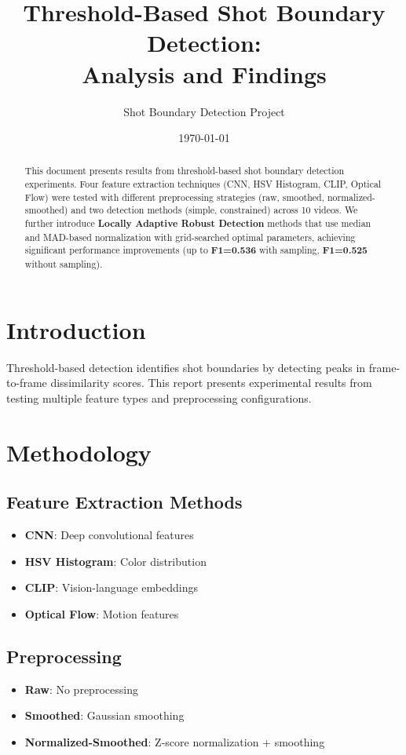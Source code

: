 \documentclass[11pt,a4paper]{article}
\title{\textbf{Threshold-Based Shot Boundary Detection:\\Analysis and Findings}}
\author{Shot Boundary Detection Project}
\date{\today}
\begin{document}
\maketitle

\begin{abstract}
This document presents results from threshold-based shot boundary detection experiments. Four feature extraction techniques (CNN, HSV Histogram, CLIP, Optical Flow) were tested with different preprocessing strategies (raw, smoothed, normalized-smoothed) and two detection methods (simple, constrained) across 10 videos. We further introduce \textbf{Locally Adaptive Robust Detection} methods that use median and MAD-based normalization with grid-searched optimal parameters, achieving significant performance improvements (up to \textbf{F1=0.536} with sampling, \textbf{F1=0.525} without sampling).
\end{abstract}

\section{Introduction}

Threshold-based detection identifies shot boundaries by detecting peaks in frame-to-frame dissimilarity scores. This report presents experimental results from testing multiple feature types and preprocessing configurations.

\section{Methodology}

\subsection{Feature Extraction Methods}
\begin{itemize}
    \item \textbf{CNN}: Deep convolutional features
    \item \textbf{HSV Histogram}: Color distribution
    \item \textbf{CLIP}: Vision-language embeddings
    \item \textbf{Optical Flow}: Motion features
\end{itemize}

\subsection{Preprocessing}
\begin{itemize}
    \item \textbf{Raw}: No preprocessing
    \item \textbf{Smoothed}: Gaussian smoothing
    \item \textbf{Normalized-Smoothed}: Z-score normalization + smoothing
\end{itemize}
\end{document}
